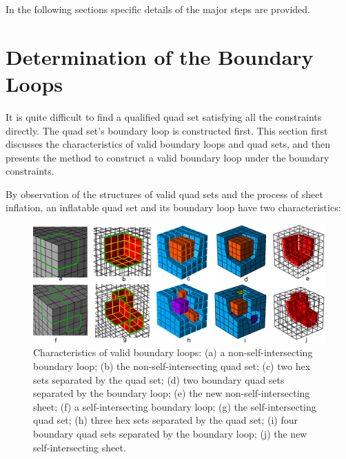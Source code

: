 \documentclass[final,5p,times,twocolumn]{elsarticle}
\begin{document}
In the following sections specific details of the major steps are provided.

\section{Determination of the Boundary Loops}
\label{sec:det_bound_loops}
It is quite difficult to find a qualified quad set satisfying all the constraints directly. The quad set's boundary loop is constructed first. This section first discusses the characteristics of valid boundary loops and quad sets, and then presents the method to construct a valid boundary loop under the boundary constraints.

By observation of the structures of valid quad sets and the process of sheet inflation, an inflatable quad set and its boundary loop have two characteristics:

\begin{figure}[htbp]
\begin{center}
\includegraphics[width=15cm]{compo_loop_prop.png}
\caption{Characteristics of valid boundary loops: (a) a non-self-intersecting boundary loop; (b) the non-self-intersecting quad set; (c) two hex sets separated by the quad set; (d) two boundary quad sets separated by the boundary loop; (e) the new non-self-intersecting sheet; (f) a self-intersecting boundary loop; (g) the self-intersecting quad set; (h) three hex sets separated by the quad set; (i) four boundary quad sets separated by the boundary loop; (j) the new self-intersecting sheet.}
\label{fig:loop_prop}
\end{center}
\end{figure}
\end{document}
